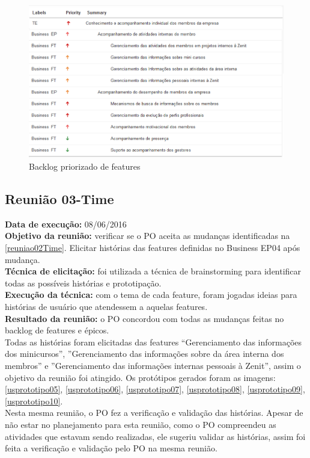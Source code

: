 \begin{figure}[H]
    \centering
    \includegraphics[keepaspectratio=true,scale=0.6]{figuras/blft03.eps}
    \caption[Backlog features]{Backlog priorizado de features\label{blft03}}
\end{figure}

\subsection{Reunião 03-Time}

 \indent \textbf{Data de execução:} 08/06/2016\\
 \indent \textbf{Objetivo da reunião:} verificar se o PO aceita as mudanças identificadas na \ref{reuniao02Time}. Elicitar histórias das features definidas no Business EP04 após mudança. \\
 \indent \textbf{Técnica de elicitação:} foi utilizada a técnica de brainstorming para identificar todas as possíveis histórias e prototipação.\\
 \indent \textbf{Execução da técnica:} com o tema de cada feature, foram jogadas ideias para histórias de usuário que atendessem a aquelas features.\\
 \indent \textbf{Resultado da reunião:} o PO concordou com todas as mudanças feitas no backlog de features e épicos.\\
 \indent Todas as histórias foram elicitadas das features “Gerenciamento das informações dos minicursos”, ”Gerenciamento das informações sobre da área interna dos membros” e ”Gerenciamento das informações internas pessoais à Zenit”, assim o objetivo da reunião foi atingido. Os protótipos gerados foram as imagens: \ref{usprototipo05}, \ref{usprototipo06}, \ref{usprototipo07}, \ref{usprototipo08}, \ref{usprototipo09}, \ref{usprototipo10}.\\
 \indent Nesta mesma reunião, o PO fez a verificação e validação das histórias. Apesar de não estar no planejamento para esta reunião, como o PO compreendeu as atividades que estavam sendo realizadas, ele sugeriu validar as histórias, assim foi feita a verificação e validação pelo PO na mesma reunião.

